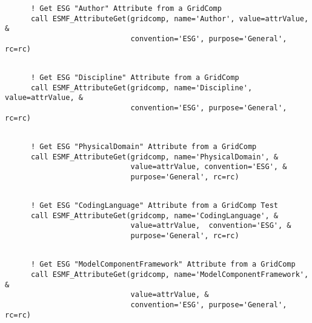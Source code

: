  \begin{verbatim}
      ! Get ESG "Author" Attribute from a GridComp
      call ESMF_AttributeGet(gridcomp, name='Author', value=attrValue, &
                             convention='ESG', purpose='General', rc=rc)
 
\end{verbatim}
 

 \begin{verbatim}
      ! Get ESG "Discipline" Attribute from a GridComp
      call ESMF_AttributeGet(gridcomp, name='Discipline', value=attrValue, &
                             convention='ESG', purpose='General', rc=rc)
 
\end{verbatim}
 

 \begin{verbatim}
      ! Get ESG "PhysicalDomain" Attribute from a GridComp
      call ESMF_AttributeGet(gridcomp, name='PhysicalDomain', &
                             value=attrValue, convention='ESG', &
                             purpose='General', rc=rc)
 
\end{verbatim}
 

 \begin{verbatim}
      ! Get ESG "CodingLanguage" Attribute from a GridComp Test
      call ESMF_AttributeGet(gridcomp, name='CodingLanguage', &
                             value=attrValue,  convention='ESG', &
                             purpose='General', rc=rc)
 
\end{verbatim}
 

 \begin{verbatim}
      ! Get ESG "ModelComponentFramework" Attribute from a GridComp
      call ESMF_AttributeGet(gridcomp, name='ModelComponentFramework', &
                             value=attrValue, &
                             convention='ESG', purpose='General', rc=rc)
 
\end{verbatim}
 


